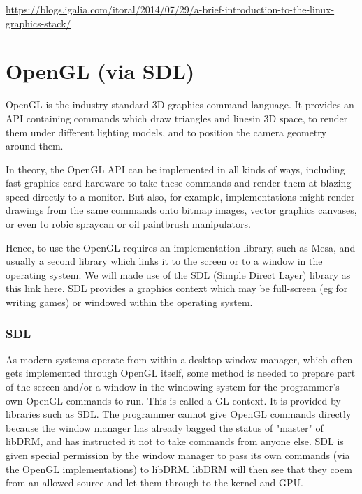 \documentclass[oneside,english]{scrbook}
\begin{document}
\url{https://blogs.igalia.com/itoral/2014/07/29/a-brief-introduction-to-the-linux-graphics-stack/}


\chapter{OpenGL (via SDL)}

OpenGL is the industry standard 3D graphics command language.  It provides an API containing commands which draw triangles and linesin 3D space, to render them under different lighting models, and to position the camera geometry around them.

In theory, the OpenGL API can be implemented in all kinds of ways, including fast graphics card hardware to take these commands and render them at blazing speed directly to a monitor. But also, for example, implementations might render drawings from the same commands onto bitmap images, vector graphics canvases, or even to robic spraycan or oil paintbrush manipulators.

Hence, to use the OpenGL requires an implementation library, such as Mesa, and usually a second library which links it to the screen or to a window in the operating system.   We will made use of the SDL (Simple Direct Layer) library as this link here.   SDL provides a graphics context which may be full-screen (eg for writing games) or windowed within the operating system.   


\subsection{SDL}

As modern systems operate from within a desktop window manager, which often gets implemented through OpenGL itself, some method is needed to prepare part of the screen and/or a window in the windowing system for the programmer's own OpenGL commands to run.  This is called a GL context.  It is provided by libraries such as SDL.   The programmer cannot give OpenGL commands directly because the window manager has already bagged the status of "master" of libDRM, and has instructed it not to take commands from anyone else.  SDL is given special permission by the window manager to pass its own commands (via the OpenGL implementations) to libDRM.  libDRM will then see that they coem from an allowed source and let them through to the kernel and GPU.
\end{document}

